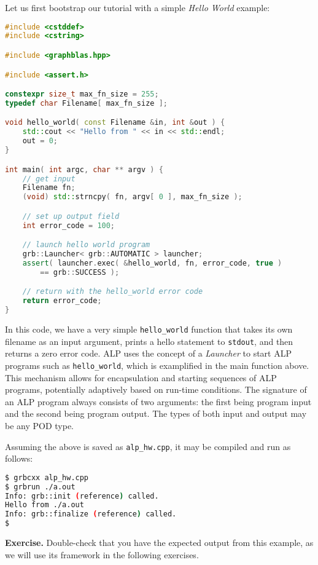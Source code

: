 Let us first bootstrap our tutorial with a simple \emph{Hello World} example:

\begin{lstlisting}[language=c++,morekeywords=constexpr,morekeywords=size_t]
#include <cstddef>
#include <cstring>

#include <graphblas.hpp>

#include <assert.h>

constexpr size_t max_fn_size = 255;
typedef char Filename[ max_fn_size ];

void hello_world( const Filename &in, int &out ) {
	std::cout << "Hello from " << in << std::endl;
	out = 0;
}

int main( int argc, char ** argv ) {
	// get input
	Filename fn;
	(void) std::strncpy( fn, argv[ 0 ], max_fn_size );

	// set up output field
	int error_code = 100;

	// launch hello world program
	grb::Launcher< grb::AUTOMATIC > launcher;
	assert( launcher.exec( &hello_world, fn, error_code, true )
		== grb::SUCCESS );

	// return with the hello_world error code
	return error_code;
}
\end{lstlisting}

In this code, we have a very simple \texttt{hello\_world} function that takes its own filename as an input argument, prints a hello statement to \texttt{stdout}, and then returns a zero error code.
ALP uses the concept of a \emph{Launcher} to start ALP programs such as \texttt{hello\_world}, which is examplified in the main function above. This mechanism allows for encapsulation and starting sequences of ALP programs, potentially adaptively based on run-time conditions. The signature of an ALP program always consists of two arguments: the first being program input and the second being program output. The types of both input and output may be any POD type.

Assuming the above is saved as \texttt{alp\_hw.cpp}, it may be compiled and run as follows:
\begin{lstlisting}[language=bash]
$ grbcxx alp_hw.cpp
$ grbrun ./a.out
Info: grb::init (reference) called.
Hello from ./a.out
Info: grb::finalize (reference) called.
$ 
\end{lstlisting}

\noindent \textbf{Exercise.} Double-check that you have the expected output from this example, as we will use its framework in the following exercises.

